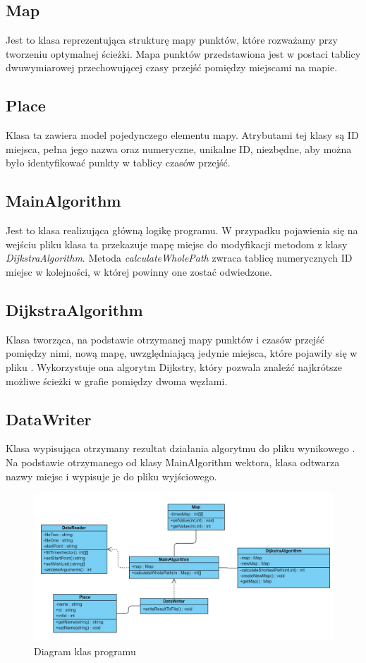\documentclass[12pt,a4paper]{article}
\begin{document}
\subsection{Map}
Jest to klasa reprezentująca strukturę mapy punktów, które rozważamy przy tworzeniu optymalnej ścieżki. Mapa punktów przedstawiona jest w postaci tablicy dwuwymiarowej przechowującej czasy przejść pomiędzy miejscami na mapie.
\subsection{Place}
Klasa ta zawiera model pojedynczego elementu mapy. Atrybutami tej klasy są ID miejsca, pełna jego nazwa oraz numeryczne, unikalne ID, niezbędne, aby można było identyfikować punkty w tablicy czasów przejść.
\subsection{MainAlgorithm}
Jest to klasa realizująca główną logikę programu. W przypadku pojawienia się na wejściu pliku  klasa ta przekazuje mapę miejsc do modyfikacji metodom z klasy \textsl{DijkstraAlgorithm}.
Metoda \textsl{calculateWholePath} zwraca tablicę numerycznych ID miejsc w kolejności, w której powinny one zostać odwiedzone.
\subsection{DijkstraAlgorithm}
Klasa tworząca, na podstawie otrzymanej mapy punktów i czasów przejść pomiędzy nimi, nową mapę, uwzględniającą jedynie miejsca, które pojawiły się w pliku . Wykorzystuje ona algorytm Dijkstry, który pozwala znaleźć najkrótsze możliwe ścieżki w grafie pomiędzy dwoma węzłami.
\subsection{DataWriter}
Klasa wypisująca otrzymany rezultat działania algorytmu do pliku wynikowego . Na podstawie otrzymanego od klasy MainAlgorithm wektora, klasa odtwarza nazwy miejsc i wypisuje je do pliku wyjściowego.
\begin{figure}[h!]
\includegraphics[width=\linewidth]{ClassDiagram.jpg}
\caption{Diagram klas programu}
\end{figure}
\newpage
\end{document}
